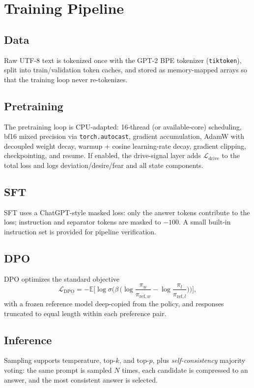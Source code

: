 \documentclass[11pt]{article}
\begin{document}
\section{Training Pipeline}
\label{sec:pipeline}

\subsection{Data}
Raw UTF-8 text is tokenized once with the GPT-2 BPE tokenizer
(\texttt{tiktoken}), split into train/validation token caches, and stored as
memory-mapped arrays so that the training loop never re-tokenizes.

\subsection{Pretraining}
The pretraining loop is CPU-adapted: 16-thread (or available-core) scheduling,
bf16 mixed precision via \texttt{torch.autocast}, gradient accumulation, AdamW
with decoupled weight decay, warmup + cosine learning-rate decay, gradient
clipping, checkpointing, and resume. If enabled, the drive-signal layer adds
$\mathcal{L}_{\mathrm{drive}}$ to the total loss and logs
deviation/desire/fear and all state components.

\subsection{SFT}
SFT uses a ChatGPT-style masked loss: only the answer tokens contribute to the
loss; instruction and separator tokens are masked to $-100$. A small built-in
instruction set is provided for pipeline verification.

\subsection{DPO}
DPO optimizes the standard objective
\begin{equation}
  \mathcal{L}_{\mathrm{DPO}} = -\mathbb{E}\Big[
  \log\sigma\big(\beta\,\big(
    \log\frac{\pi_w}{\pi_{\mathrm{ref},w}}
    - \log\frac{\pi_l}{\pi_{\mathrm{ref},l}}\big)\big)\Big],
\end{equation}
with a frozen reference model deep-copied from the policy, and responses
truncated to equal length within each preference pair.

\subsection{Inference}
Sampling supports temperature, top-$k$, and top-$p$, plus \emph{self-consistency}
majority voting: the same prompt is sampled $N$ times, each candidate is
compressed to an answer, and the most consistent answer is selected.
\end{document}
